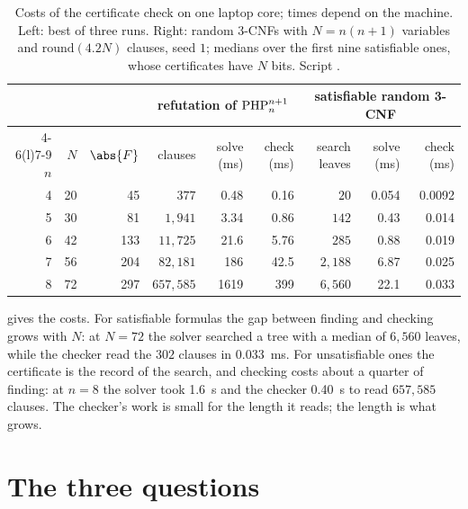 \begin{refsection}
\begin{table}[t]
\begin{fullwidth}
\centering
\small
\begin{tabular}{@{}rrrrrrrrr@{}}
\toprule
& & & \multicolumn{3}{c}{refutation of $\mathrm{PHP}^{n+1}_{n}$} & \multicolumn{3}{c}{satisfiable random 3-CNF} \\
\cmidrule(lr){4-6}\cmidrule(l){7-9}
$n$ & $N$ & $\abs{F}$ & clauses & solve (ms) & check (ms) & search leaves & solve (ms) & check (ms) \\
\midrule
4 & 20 & 45 & $377$ & 0.48 & 0.16 & $20$ & 0.054 & 0.0092 \\
5 & 30 & 81 & $1{,}941$ & 3.34 & 0.86 & $142$ & 0.43 & 0.014 \\
6 & 42 & 133 & $11{,}725$ & 21.6 & 5.76 & $285$ & 0.88 & 0.019 \\
7 & 56 & 204 & $82{,}181$ & 186 & 42.5 & $2{,}188$ & 6.87 & 0.025 \\
8 & 72 & 297 & $657{,}585$ & 1619 & 399 & $6{,}560$ & 22.1 & 0.033 \\
\bottomrule
\end{tabular}
\caption{Costs of the certificate check on one laptop core; times depend on the machine. Left: best of three runs. Right: random 3-CNFs with $N=n(n+1)$ variables and $\mathrm{round}(4.2N)$ clauses, seed $1$; medians over the first nine satisfiable ones, whose certificates have $N$ bits. Script .}
\label{tab:certificates:costs}
\end{fullwidth}
\end{table}

 gives the costs. For satisfiable formulas the gap between finding and checking grows with $N$: at $N=72$ the solver searched a tree with a median of $6{,}560$ leaves, while the checker read the $302$ clauses in 0.033~ms. For unsatisfiable ones the certificate is the record of the search, and checking costs about a quarter of finding: at $n=8$ the solver took 1.6~s and the checker 0.40~s to read $657{,}585$ clauses. The checker's work is small for the length it reads; the length is what grows.

\section{The three questions}\label{sec:certificates:questions}


\end{refsection}
